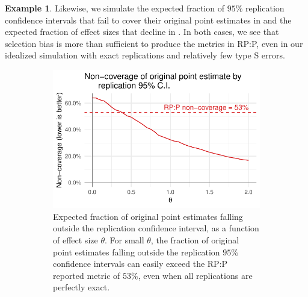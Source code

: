 \documentclass[11pt]{article}
\theoremstyle{definition}
\newtheorem{example}{Example}
\theoremstyle{custom}
\begin{document}
\begin{example}
    Likewise, we simulate the expected fraction of $95\%$ replication confidence intervals that fail to cover their original point estimates in  and the expected fraction of effect sizes that decline in . In both cases, we see that selection bias is more than sufficient to produce the metrics in RP:P, even in our idealized simulation with exact replications and relatively few type S errors.
    \begin{figure}[htbp]
	    \centering
	    \begin{subfigure}[t]{0.59\hsize}
	      \centering
	      \includegraphics[width=\hsize]{naive-ci-sim}
	      \caption{Expected fraction of original point estimates falling outside the replication confidence interval, as a function of effect size $\theta$. For small $\theta$, the fraction of original point estimates falling outside the replication $95\%$ confidence intervals can easily exceed the RP:P reported metric of $53\%$, even when all replications are perfectly exact.}
	    \label{fig:naive-ci-sim-func}
	    \end{subfigure}
	    \hfill
	    \begin{subfigure}[t]{0.39\hsize}
	      \centering

\end{subfigure}
\end{figure}
\end{example}
\end{document}
